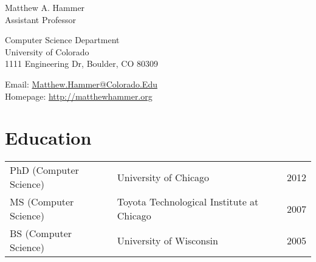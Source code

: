 \documentclass[10pt,letterpaper]{article}
\def\name{Matthew A. Hammer}
\renewenvironment{itemize}{
  \begin{list}{}{
    \setlength{\leftmargin}{1.5em}
    \setlength{\itemsep}{0.25em}
    \setlength{\parskip}{0pt}
    \setlength{\parsep}{0.25em}
  }
}{
  \end{list}
}
\begin{document}
{{\huge \name}
\\
Assistant Professor
}


\bigskip

\begin{minipage}[t]{0.495\textwidth}
Computer Science Department\\
University of Colorado\\
1111 Engineering Dr, Boulder, CO 80309
\end{minipage}
\begin{minipage}[t]{0.495\textwidth}
  Email: \href{mailto:matthew.hammer@colorado.edu}{Matthew.Hammer@Colorado.Edu} \\
  Homepage: \href{http://matthewhammer.org}{http://matthewhammer.org}
\end{minipage}

\section*{Education}

\begin{tabular}[t]{@{}l l l@{}}
PhD (Computer Science) & University of Chicago & 2012 \\
MS  (Computer Science) & Toyota Technological Institute at Chicago & 2007 \\
BS  (Computer Science) & University of Wisconsin & 2005 \\
\end{tabular}



\end{document}
